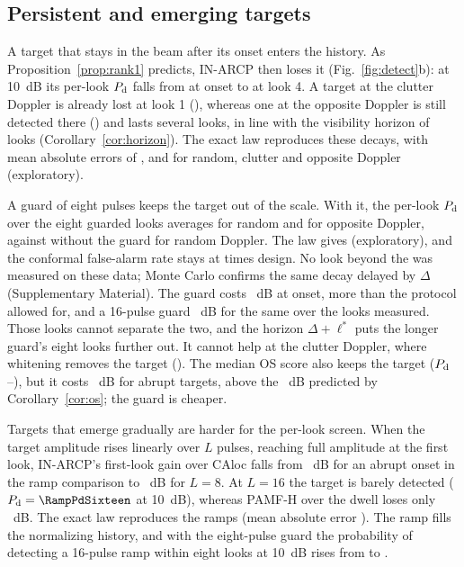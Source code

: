 \documentclass[journal]{IEEEtran}
\begin{document}
\subsection{Persistent and emerging targets}\label{sec:onset}
A target that stays in the beam after its onset enters the history. As Proposition~\ref{prop:rank1} predicts, IN-ARCP then loses it (Fig.~\ref{fig:detect}b): at 10~dB its per-look $P_{\rm d}$ falls from \OnLookZero{} at onset to \OnLookFour{} at look 4. A target at the clutter Doppler is already lost at look 1 (\OnMatchedOne), whereas one at the opposite Doppler is still detected there (\OnOppOne) and lasts several looks, in line with the visibility horizon of \ThHorizonOpp{} looks (Corollary~\ref{cor:horizon}). The exact law reproduces these decays, with mean absolute errors of \OnTheoryMaeRand, \OnTheoryMaeMatch{} and \OnTheoryMaeOpp{} for random, clutter and opposite Doppler (exploratory).

A guard of eight pulses keeps the target out of the scale. With it, the per-look $P_{\rm d}$ over the eight guarded looks averages \GuardMeanLookEight{} for random and \GuardOppEight{} for opposite Doppler, against \GuardMeanLookZero{} without the guard for random Doppler. The law gives \GuardLawEight{} (exploratory), and the conformal false-alarm rate stays at \GuardPfaEight{} times design. No look beyond the \GuardLooksMeasuredOrd{} was measured on these data; Monte Carlo confirms the same decay delayed by $\Delta$ (Supplementary Material). The guard costs \GuardOnsetCost~dB at onset, more than the protocol allowed for, and a 16-pulse guard \GuardOnsetCostSixteen~dB for the same \GuardMeanLookSixteen{} over the looks measured. Those looks cannot separate the two, and the horizon $\Delta+\ell^*$ puts the longer guard's eight looks further out. It cannot help at the clutter Doppler, where whitening removes the target (\GuardMatchedEight). The median OS score also keeps the target ($P_{\rm d}$ \OsPersFirst--\OsPersLast), but it costs \OsCostEight~dB for abrupt targets, above the \OSLossEight~dB predicted by Corollary~\ref{cor:os}; the guard is cheaper.

Targets that emerge gradually are harder for the per-look screen. When the target amplitude rises linearly over $L$ pulses, reaching full amplitude at the first look, IN-ARCP's first-look gain over CAloc falls from \RampGainOne~dB for an abrupt onset in the ramp comparison to \RampGainEight~dB for $L=8$. At $L=16$ the target is barely detected ($P_{\rm d}=\RampPdSixteen$ at 10~dB), whereas PAMF-H over the dwell loses only \RampPAMFLoss~dB. The exact law reproduces the ramps (mean absolute error \RampMae). The ramp fills the normalizing history, and with the eight-pulse guard the probability of detecting a 16-pulse ramp within eight looks at 10~dB rises from \GuardRampZero{} to \GuardRampEight.
\end{document}
